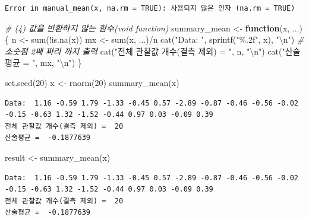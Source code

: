 \documentclass[
  11pt,
]{krantz}
\newenvironment{Shaded}{\begin{snugshade}}{\end{snugshade}}
\newcommand{\CommentTok}[1]{\textcolor[rgb]{0.37,0.37,0.37}{\textit{#1}}}
\newcommand{\ControlFlowTok}[1]{\textcolor[rgb]{0.27,0.27,0.27}{\textbf{#1}}}
\newcommand{\DecValTok}[1]{\textcolor[rgb]{0.06,0.06,0.06}{#1}}
\newcommand{\FunctionTok}[1]{\textcolor[rgb]{0,0,0}{#1}}
\newcommand{\NormalTok}[1]{#1}
\newcommand{\OtherTok}[1]{\textcolor[rgb]{0.37,0.37,0.37}{#1}}
\newcommand{\SpecialCharTok}[1]{\textcolor[rgb]{0,0,0}{#1}}
\newcommand{\StringTok}[1]{\textcolor[rgb]{0.5,0.5,0.5}{#1}}
\begin{document}
\begin{verbatim}
Error in manual_mean(x, na.rm = TRUE): 사용되지 않은 인자 (na.rm = TRUE)
\end{verbatim}

\normalsize

\footnotesize

\begin{Shaded}
\begin{Highlighting}[]
\CommentTok{\# (4) 값을 반환하지 않는 함수(void function)}
\NormalTok{summary\_mean }\OtherTok{\textless{}{-}} \ControlFlowTok{function}\NormalTok{(x, ...) \{}
\NormalTok{  n }\OtherTok{\textless{}{-}} \FunctionTok{sum}\NormalTok{(}\SpecialCharTok{!}\FunctionTok{is.na}\NormalTok{(x))}
\NormalTok{  mx }\OtherTok{\textless{}{-}} \FunctionTok{sum}\NormalTok{(x, ...)}\SpecialCharTok{/}\NormalTok{n}
  \FunctionTok{cat}\NormalTok{(}\StringTok{"Data: "}\NormalTok{, }\FunctionTok{sprintf}\NormalTok{(}\StringTok{"\%.2f"}\NormalTok{, x), }\StringTok{"}\SpecialCharTok{\textbackslash{}n}\StringTok{"}\NormalTok{) }\CommentTok{\# 소숫점 2째 짜리 까지 출력}
  \FunctionTok{cat}\NormalTok{(}\StringTok{"전체 관찰값 개수(결측 제외) = "}\NormalTok{, n, }\StringTok{"}\SpecialCharTok{\textbackslash{}n}\StringTok{"}\NormalTok{)}
  \FunctionTok{cat}\NormalTok{(}\StringTok{"산술평균 = "}\NormalTok{, mx, }\StringTok{"}\SpecialCharTok{\textbackslash{}n}\StringTok{"}\NormalTok{)}
\NormalTok{\}}


\FunctionTok{set.seed}\NormalTok{(}\DecValTok{20}\NormalTok{)}
\NormalTok{x }\OtherTok{\textless{}{-}} \FunctionTok{rnorm}\NormalTok{(}\DecValTok{20}\NormalTok{)}
\FunctionTok{summary\_mean}\NormalTok{(x)}
\end{Highlighting}
\end{Shaded}

\begin{verbatim}
Data:  1.16 -0.59 1.79 -1.33 -0.45 0.57 -2.89 -0.87 -0.46 -0.56 -0.02 -0.15 -0.63 1.32 -1.52 -0.44 0.97 0.03 -0.09 0.39 
전체 관찰값 개수(결측 제외) =  20 
산술평균 =  -0.1877639 
\end{verbatim}

\begin{Shaded}
\begin{Highlighting}[]
\NormalTok{result }\OtherTok{\textless{}{-}} \FunctionTok{summary\_mean}\NormalTok{(x)}
\end{Highlighting}
\end{Shaded}

\begin{verbatim}
Data:  1.16 -0.59 1.79 -1.33 -0.45 0.57 -2.89 -0.87 -0.46 -0.56 -0.02 -0.15 -0.63 1.32 -1.52 -0.44 0.97 0.03 -0.09 0.39 
전체 관찰값 개수(결측 제외) =  20 
산술평균 =  -0.1877639 
\end{verbatim}
\end{document}
